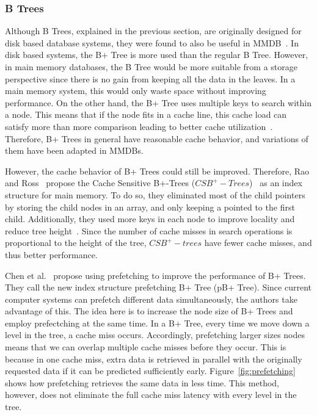 \documentclass[12pt,a4paper]{article}
\begin{document}
\subsubsection*{B Trees}
Although B Trees, explained in the previous section, are originally designed for disk based database systems, they were found to also be useful in
MMDB~\cite{lehman1986study}. In disk based systems, the B+ Tree is more used than the regular B Tree. However, in main memory databases, the B Tree would be
more suitable from a storage perspective since there is no gain from keeping all the data in the leaves. In a main memory system, this
would only waste space without improving performance. On the other hand, the B+ Tree uses multiple keys to search within a node. This means that
if the node fits in a cache line, this cache load can satisfy more than more comparison leading to better cache utilization~\cite{rao1999cache}. Therefore, B+
Trees in general have reasonable cache behavior, and variations of them have been adapted in MMDBs.

However, the cache behavior of B+ Trees could still be improved. Therefore, Rao and Ross~\cite{rao2000making} propose the Cache Sensitive B+-Trees
($CSB^{+}-Trees$)~\cite{rao2000making} as an index structure for main memory. To do so, they eliminated most of the child pointers by storing the child nodes
in an array, and only keeping a pointed to the first child. Additionally, they used more keys in each
node to improve locality and reduce tree height~\cite{luan2009prefetching}. Since the number of cache misses in search operations is proportional to the height
of the tree, $CSB^{+}-trees$ have fewer cache misses, and thus better performance.

Chen et al.~\cite{chen2001improving} propose using prefetching to improve the performance of B+ Trees. They call the new index structure prefetching B+ Tree
(pB+ Tree). Since current computer systems can prefetch different data simultaneously, the authors take advantage of this. The idea here is to increase the node
size of B+ Trees and employ prefectching at the same time. In a B+ Tree, every time we move down a level in the tree, a cache miss occurs. Accordingly,
prefetching larger sizes nodes means that we can overlap multiple cache misses before they occur. This is because in one cache miss, extra data is retrieved in
parallel with the originally requested data if it can be predicted sufficiently early. Figure~\ref{fig:prefetching} shows how prefetching retrieves the same
data in less time. This method, however, does not eliminate the full cache miss latency with every level in the tree.
\end{document}
